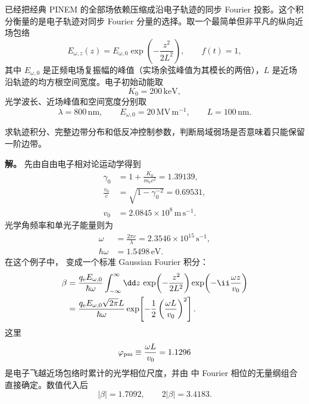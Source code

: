 
\begin{exbox}
 已经把经典 PINEM 的全部场依赖压缩成沿电子轨迹的同步 Fourier 投影。这个积分衡量的是电子轨迹对同步 Fourier 分量的选择。取一个最简单但非平凡的纵向近场包络
\begin{equation*}
 E_{\omega,z}(z)=E_{\omega,0}\exp\!\left(-\frac{z^2}{2L^2}\right),
 \qquad f(t)=1,
\end{equation*}
其中 $E_{\omega,0}$ 是正频电场复振幅的峰值（实场余弦峰值为其模长的两倍），$L$ 是近场沿轨迹的均方根空间宽度。电子初始动能取
\begin{equation*}
 K_0=200\,\mathrm{keV},
\end{equation*}
光学波长、近场峰值和空间宽度分别取
\begin{equation*}
 \lambda=800\,\mathrm{nm},\qquad
 E_{\omega,0}=20\,\mathrm{MV\,m^{-1}},\qquad
 L=100\,\mathrm{nm}.
\end{equation*}

求轨迹积分、完整边带分布和低反冲控制参数，判断局域弱场是否意味着只能保留一阶边带。

\textbf{解。} 先由自由电子相对论运动学得到
\begin{align*}
 \gamma_0
 &=1+\frac{K_0}{m_{\mathrm e} c^2}
 =1.39139,\\
 \frac{v_0}{c}
 &=\sqrt{1-\gamma_0^{-2}}
 =0.69531,\\
 v_0&=2.0845\times10^8\,\mathrm{m\,s^{-1}}.
\end{align*}
光学角频率和单光子能量则为
\begin{align*}
 \omega&=\frac{2\pi c}{\lambda}
 =2.3546\times10^{15}\,\mathrm{s^{-1}},\\
 \hbar\omega&=1.5498\,\mathrm{eV}.
\end{align*}
在这个例子中， 变成一个标准 Gaussian Fourier 积分：
\begin{align}
 \beta
 &=\frac{q_{\mathrm e} E_{\omega,0}}{\hbar\omega}
 \int_{-\infty}^{\infty}\dd z\,
 \exp\!\left(-\frac{z^2}{2L^2}\right)
 \exp\!\left(-\ii\frac{\omega z}{v_0}\right)\notag\\
 &=\frac{q_{\mathrm e} E_{\omega,0}\sqrt{2\pi}L}{\hbar\omega}
 \exp\!\left[-\frac12\left(\frac{\omega L}{v_0}\right)^2\right].
 \label{eq:pinem-gaussian-beta-dp65}
\end{align}
这里
\begin{equation*}
 \varphi_{\rm pm}\equiv\frac{\omega L}{v_0}=1.1296
\end{equation*}
是电子飞越近场包络时累计的光学相位尺度，并由 中 Fourier 相位的无量纲组合直接确定。数值代入后
\begin{equation}
 \boxed{|\beta|=1.7092,\qquad 2|\beta|=3.4183.}
 \label{eq:pinem-gaussian-beta-number-dp65}
\end{equation}


\end{exbox}
